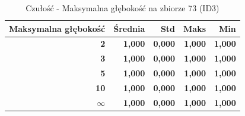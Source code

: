 \begin{table}[htbp]
\centering
\small
\setlength{\tabcolsep}{6pt}
\renewcommand{\arraystretch}{1.2}
\caption{Czułość - Maksymalna głębokość na zbiorze 73 (ID3)}
\label{tab:ID3_max_depth_73_recall}
\begin{tabular}{r|r|r|r|r}
\toprule
Maksymalna głębokość & Średnia & Std & Maks & Min \\
\hline
\textbf{2} & \textbf{1,000} & \textbf{0,000} & \textbf{1,000} & \textbf{1,000} \\
\textbf{3} & \textbf{1,000} & \textbf{0,000} & \textbf{1,000} & \textbf{1,000} \\
\textbf{5} & \textbf{1,000} & \textbf{0,000} & \textbf{1,000} & \textbf{1,000} \\
\textbf{10} & \textbf{1,000} & \textbf{0,000} & \textbf{1,000} & \textbf{1,000} \\
\textbf{$\infty$} & \textbf{1,000} & \textbf{0,000} & \textbf{1,000} & \textbf{1,000} \\
\bottomrule
\end{tabular}
\end{table}